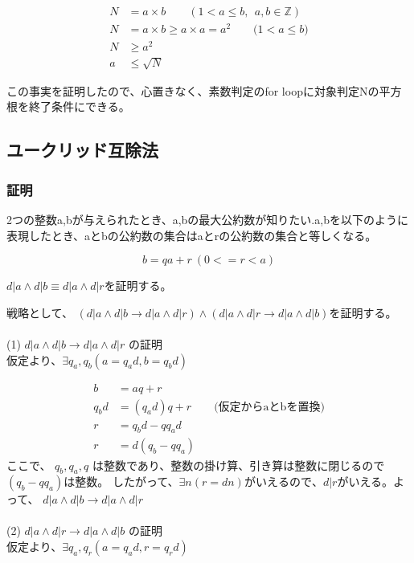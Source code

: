\documentclass[dvipdfmx]{jsarticle}
\begin{document}
\begin{align*}
  N &= a \times b \qquad ( 1 < a \leq b, \ \ a, b \in\mathbb{Z}) \\
  N &= a \times b \geq a \times a = a^2 \qquad \text{($1 < a \leq b $)} \\
  N &\geq a^2 \\
  a &\leq \sqrt{N}
\end{align*}

この事実を証明したので、心置きなく、素数判定のfor loopに対象判定Nの平方根を終了条件にできる。

\subsection{ユークリッド互除法}

\subsubsection{証明}

2つの整数a,bが与えられたとき、a,bの最大公約数が知りたい.a,bを以下のように表現したとき、aとbの公約数の集合はaとrの公約数の集合と等しくなる。

\[ b = qa + r \ (0 <= r < a)\]

$d | a \land d | b \equiv d | a \land d | r $を証明する。

戦略として、 $(d | a \land d | b \rightarrow d | a \land d | r) \land (d | a \land d | r \rightarrow  d | a \land d | b) $を証明する。
\\\\
(1) $d | a \land d | b \rightarrow d | a \land d | r$ の証明 \\
仮定より、$\exists q_a, q_b ( a = q_ad, b = q_bd)$

\begin{align*}
  b &= aq + r \\
  q_bd &= (q_ad)q + r \qquad \text{(仮定からaとbを置換)} \\
  r &= q_bd - qq_ad \\
  r &= d(q_b - qq_a)
\end{align*}
ここで、 $q_b, q_a, q$ は整数であり、整数の掛け算、引き算は整数に閉じるので$(q_b - qq_a)$は整数。
  したがって、$\exists n ( r = dn) がいえるので、 d | r$がいえる。よって、
  $d | a \land d | b \rightarrow d | a \land d | r$
\\\\
(2) $d | a \land d | r \rightarrow d | a \land d | b$ の証明 \\
仮定より、$\exists q_a, q_r ( a = q_ad, r = q_rd)$
\end{document}
